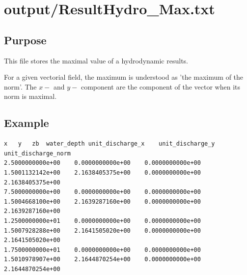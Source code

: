 \section{output/ResultHydro\_Max.txt}

\subsection{Purpose}
This file stores the maximal value of a hydrodynamic results.


For a given vectorial field, the maximum is understood as 'the maximum of the norm'. The $x-$ and $y-$ component are the component of the vector when its norm is maximal.


\subsection{Example}
\begin{verbatim}
x	y	zb	water_depth	unit_discharge_x	unit_discharge_y	unit_discharge_norm
2.5000000000e+00	0.0000000000e+00	0.0000000000e+00	1.5001132142e+00	2.1638405375e+00	0.0000000000e+00	2.1638405375e+00
7.5000000000e+00	0.0000000000e+00	0.0000000000e+00	1.5004668100e+00	2.1639287160e+00	0.0000000000e+00	2.1639287160e+00
1.2500000000e+01	0.0000000000e+00	0.0000000000e+00	1.5007928288e+00	2.1641505020e+00	0.0000000000e+00	2.1641505020e+00
1.7500000000e+01	0.0000000000e+00	0.0000000000e+00	1.5010978907e+00	2.1644870254e+00	0.0000000000e+00	2.1644870254e+00
\end{verbatim}